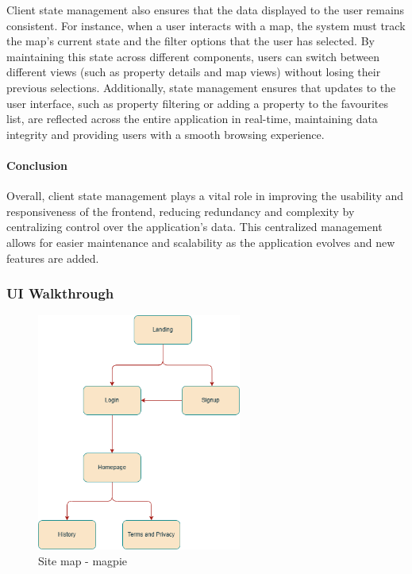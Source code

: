     Client state management also ensures that the data displayed to the user remains consistent. For instance, when a user interacts with a map, the system must track the map's current state and the filter options that the user has selected. By maintaining this state across different components, users can switch between different views (such as property details and map views) without losing their previous selections. Additionally, state management ensures that updates to the user interface, such as property filtering or adding a property to the favourites list, are reflected across the entire application in real{-}time, maintaining data integrity and providing users with a smooth browsing experience.
    \paragraph{Conclusion}\mbox{}

    Overall, client state management plays a vital role in improving the usability and responsiveness of the frontend, reducing redundancy and complexity by centralizing control over the application’s data. This centralized management allows for easier maintenance and scalability as the application evolves and new features are added.

\subsubsection{UI Walkthrough}
\begin{figure}[h]
    \centering{}
    \includegraphics[width=0.6\textwidth]{images/site/sitemap.png}
    \caption{Site map {-} magpie}
\end{figure}
